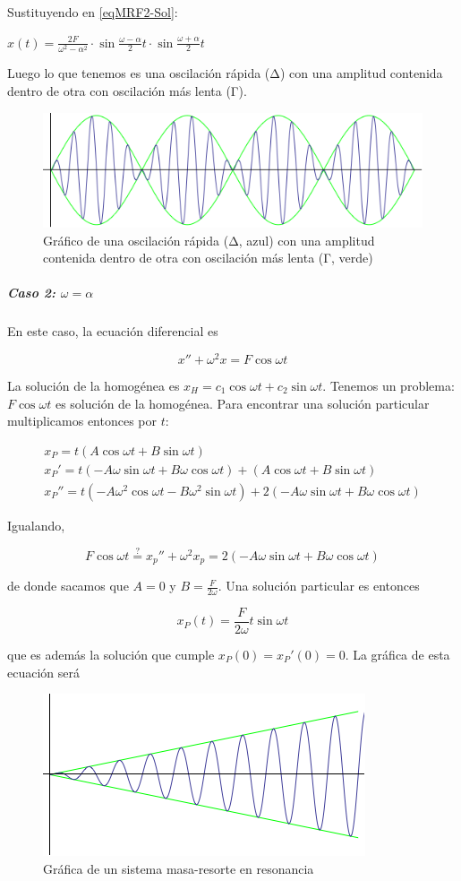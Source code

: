 Sustituyendo en \eqref{eqMRF2-Sol}:

\( x(t) = \frac{2F}{ω^2-α^2} ·\sin \frac{ω-α}{2}t · \sin \frac{ω+α}{2}t  \)

Luego lo que tenemos es una oscilación rápida (Δ) con una amplitud contenida dentro de otra con oscilación más lenta (Γ).

\begin{figure}
\centering
\includegraphics{img/MasaResorteF.png}
\caption{Gráfico de una oscilación rápida (Δ, azul) con una amplitud contenida dentro de otra con oscilación más lenta (Γ, verde)}
\label{imgMasaResorteF}
\end{figure}

\subparagraph{Caso 2: $ω=α$}

En este caso, la ecuación diferencial es 

\[ x'' + ω^2 x = F\cos ωt \]

La solución de la homogénea es $x_H = c_1 \cos ωt + c_2 \sin ωt$. Tenemos un problema: $F\cos ωt$ es solución de la homogénea. Para encontrar una solución particular multiplicamos entonces por $t$:

\begin{gather*}
x_P = t\left(A\cos ωt + B\sin ωt\right) \\
x_P' =t\left(-Aω\sin ωt + Bω\cos ωt\right) + \left(A\cos ωt + B\sin ωt\right) \\
x_P'' = t\left(-Aω^2 \cos ωt - Bω^2 \sin ωt\right) + 2\left(-Aω\sin ωt + Bω\cos ωt \right)
\end{gather*}

Igualando, 

\[ F\cos ωt \stackrel{?}{=} x_p'' + ω^2x_p = 2\left(-Aω\sin ωt + Bω\cos ωt \right) \]

de donde sacamos que $A=0$ y $B=\frac{F}{2ω}$. Una solución particular es entonces

\[ x_P(t) = \frac{F}{2ω}t \sin ωt \]

que es además la solución que cumple $x_P(0) = x_P'(0) = 0$. La gráfica de esta ecuación será

\begin{figure}[hbtp]
\centering
\includegraphics{img/MasaResorteF-Resonancia.png}
\caption{Gráfica de un sistema masa-resorte en resonancia}
\label{imgMasaResorteFR}
\end{figure}

